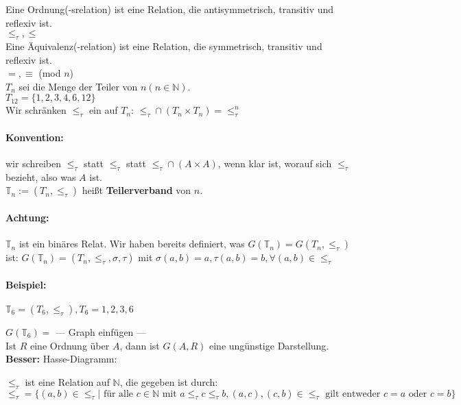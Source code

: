 \noindent Eine Ordnung(-srelation) ist eine Relation, die antisymmetrisch,
transitiv und reflexiv ist. \\  $\le_\tau, \le$ \\

\noindent Eine Äquivalenz(-relation) ist eine Relation, die symmetrisch,
transitiv und reflexiv ist. \\  $=, \equiv$ (mod $n$) \\

\noindent $T_n$ sei die Menge der Teiler von $n (n \in \mathbb{N})$. \\  $T_{12} = \{ 1, 2, 3, 4, 6, 12 \}$ \\

\noindent Wir schränken $\le_\tau$ ein auf $T_n$: $\le_\tau \cap (T_n \times T_n) = \le_\tau^n$

\paragraph{Konvention:} wir schreiben $\le_\tau$ statt $\le_\tau$ statt $\le_\tau \cap (A \times A)$, wenn klar ist, worauf sich $\le_\tau$ bezieht, also was $A$ ist. \\

\noindent $\mathbb{T}_n := (T_n, \le_\tau)$ heißt {\bf Teilerverband} von $n$.

\paragraph{Achtung:} $\mathbb{T}_n$ ist ein binäres Relat. Wir haben bereits definiert, was $G (\mathbb{T}_n) = G (T_n, \le_\tau)$ ist:
\indent $G (\mathbb{T}_n) = (T_n, \le_\tau, \sigma, \tau)$ mit $\sigma (a, b) = a, \tau (a, b) = b, \forall (a, b) \in \le_\tau$ \\

\paragraph{Beispiel:} $\mathbb{T}_6 = (T_6, \le_\tau), T_6 = { 1, 2, 3, 6 }$

$G (\mathbb{T}_6) = $ --- Graph einfügen --- \\

\noindent Ist $R$ eine Ordnung über $A$, dann ist $G (A, R)$ eine ungünstige Darstellung. \\ {\bf Besser:} Hasse-Diagramm:

$\le_\tau$ ist eine Relation auf $\mathbb{N}$, die gegeben ist durch: \\
$ \le_\tau = \{ (a, b) \in \le_\tau | \text{ für alle } c \in \mathbb{N} \text{ mit } a \le_\tau c \le_\tau b, (a, c), (c, b) \in \le_\tau \text{ gilt entweder } c = a \text{ oder } c = b \}$

